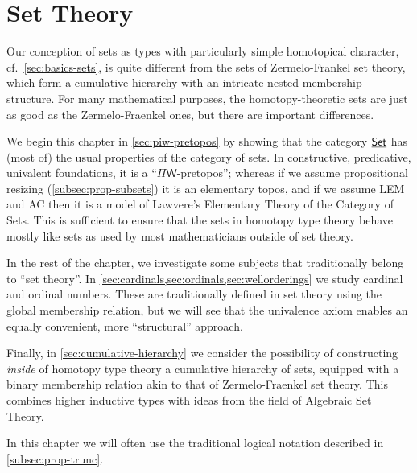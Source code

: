 \newcommand{\vset}{\mathsf{set}}  %

\chapter{Set Theory}
\label{cha:set-math}

Our conception of sets as types with particularly simple homotopical character, cf.\
\autoref{sec:basics-sets}, is quite different from the sets of Zermelo-Frankel set theory, which form a
cumulative hierarchy with an intricate nested membership structure.
For many mathematical purposes, the homotopy-theoretic sets are just as good as
the Zermelo-Fraenkel ones, but there are important differences.

We begin this chapter in \autoref{sec:piw-pretopos} by showing that the category $\underline{\mathsf{Set}}$ has (most of) the usual properties of the category of sets.
In constructive, predicative, univalent foundations, it is a ``$\Pi\mathsf{W}$-pretopos''; whereas if we assume propositional resizing (\autoref{subsec:prop-subsets}) it is an elementary topos, and if we assume LEM and AC then it is a model of Lawvere's Elementary Theory of the Category of Sets.
This is sufficient to ensure that the sets in homotopy type theory behave mostly like sets as used by most mathematicians outside of set theory.

In the rest of the chapter, we investigate some subjects that traditionally belong to ``set theory''.
In \autoref{sec:cardinals,sec:ordinals,sec:wellorderings} we study cardinal and ordinal numbers.
These are traditionally defined in set theory using the global membership relation, but we will see that the univalence axiom enables an equally convenient, more ``structural'' approach.

Finally, in \autoref{sec:cumulative-hierarchy} we consider the possibility of constructing \emph{inside} of homotopy type theory a cumulative hierarchy of sets, equipped with a binary membership relation akin to that of Zermelo-Fraenkel set theory.
This combines higher inductive types with ideas from the field of Algebraic Set Theory.

In this chapter we will often use the traditional logical notation described in \autoref{subsec:prop-trunc}.

